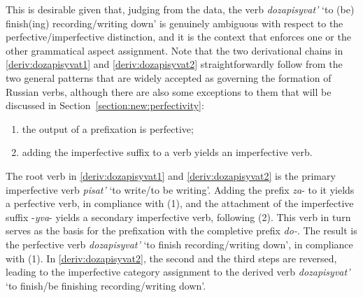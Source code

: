 This is desirable given that, judging from the data, the verb \textit{dozapisyvat'} `to (be) finish(ing) recording/writing down' is genuinely ambiguous with respect to the perfective/imperfective distinction, and it is the context that enforces one or the other grammatical aspect assignment. Note that the two derivational chains in \ref{deriv:dozapisyvat1} and \ref{deriv:dozapisyvat2} straightforwardly follow from the two general patterns that are widely accepted as governing the formation of Russian verbs, although there are also some exceptions to them that will be discussed in Section~\ref{section:new:perfectivity}:

\begin{enumerate}
\item the output of a prefixation is perfective;   
\item adding the imperfective suffix to a verb yields an imperfective verb. 
\end{enumerate}

The root verb in \ref{deriv:dozapisyvat1} and \ref{deriv:dozapisyvat2} is the primary imperfective verb \textit{pisat'} `to write/to be writing'. Adding the prefix \textit{za}- to it yields a perfective verb, in compliance with (1), and the attachment of the imperfective suffix -\textit{yva}- yields a secondary imperfective verb, following (2). This verb in turn serves as the basis for the prefixation with the completive prefix \textit{do-}. The result is the perfective verb \textit{dozapisyvat'} `to finish recording/writing down', in compliance with (1).  In \ref{deriv:dozapisyvat2}, the second and the third steps are reversed, leading to the imperfective category assignment to the derived verb \textit{dozapisyvat'} `to finish/be finishing recording/writing down'.

